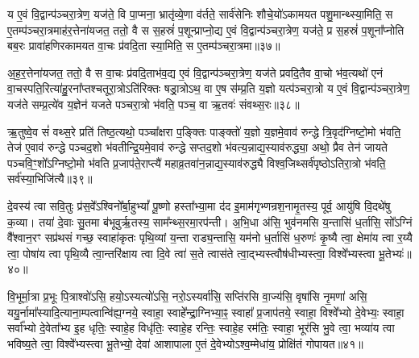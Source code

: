 य ए॒वं वि॒द्वान्प॑ञ्चरा॒त्रेण॒ यज॑ते॒ वि पा॒प्मना॒ भ्रातृ॑व्ये॒णा व॑र्तते॒ सार्व॑सेनिः शौचे॒यो॑\-ऽकामयत पशु॒मान्थ्स्या॒मिति॒ स ए॒तम्प॑ञ्चरा॒त्रमाह॑र॒त्तेना॑यजत॒ ततो॒ वै स स॒हस्रं॑ प॒शून्प्राप्नो॒द्य ए॒वं वि॒द्वान्प॑ञ्चरा॒त्रेण॒ यज॑ते॒ प्र स॒हस्रं॑ प॒शूना᳚प्नोति बब॒रः प्रावा॑हणिरकामयत वा॒चः प्र॑वदि॒ता स्या॒मिति॒ स ए॒तम्प॑ञ्चरा॒त्रमा॥३७॥

अ॒ह॒र॒त्तेना॑यजत॒ ततो॒ वै स वा॒चः प्र॑वदि॒ताभ॑व॒द्य ए॒वं वि॒द्वान्प॑ञ्चरा॒त्रेण॒ यज॑ते प्रवदि॒तैव वा॒चो भ॑व॒त्यथो॑ एनं वा॒चस्पति॒रित्या॑हु॒रना᳚प्तश्चतूरा॒त्रो\-ऽति॑रिक्तः षड्रा॒त्रो\-ऽथ॒ वा ए॒ष स॑म्प्र॒ति य॒ज्ञो यत्प॑ञ्चरा॒त्रो य ए॒वं वि॒द्वान्प॑ञ्चरा॒त्रेण॒ यज॑ते सम्प्र॒त्ये॑व य॒ज्ञेन॑ यजते पञ्चरा॒त्रो भ॑वति॒ पञ्च॒ वा ऋ॒तवः॑ संवथ्स॒रः॥३८॥

ऋ॒तुष्वे॒व सं॑ वथ्स॒रे प्रति॑ तिष्ठ॒त्यथो॒ पञ्चा᳚क्षरा प॒ङ्क्तिः पाङ्क्तो॑ य॒ज्ञो य॒ज्ञमे॒वाव॑ रुन्द्धे त्रि॒वृद॑ग्निष्टो॒मो भ॑वति॒ तेज॑ ए॒वाव॑ रुन्द्धे पञ्चद॒शो भ॑वतीन्द्रि॒यमे॒वाव॑ रुन्द्धे सप्तद॒शो भ॑वत्य॒न्नाद्य॒स्याव॑रुद्ध्या॒ अथो॒ प्रैव तेन॑ जायते पञ्चवि॒ꣳ॒शो᳚\-ऽग्निष्टो॒मो भ॑वति प्र॒जाप॑ते॒राप्त्यै॑ महाव्र॒तवा॑न॒न्नाद्य॒स्याव॑रुद्ध्यै विश्व॒जिथ्सर्व॑पृष्ठो\-ऽतिरा॒त्रो भ॑वति॒ सर्व॑स्या॒भिजि॑त्यै॥३९॥

{\anuvakamend[{ते व्याव॑र्तन्त प्रवदि॒ता स्या॒मिति॒ स ए॒तम्प़॑ञ्चरा॒त्रमा सं॑ वथ्स॒रो॑\-ऽभिजि॑त्यै॥10॥}]}

दे॒वस्य॑ त्वा सवि॒तुः प्र॑स॒वे᳚\-ऽश्विनो᳚र्बा॒हु\-भ्यां᳚ पू॒ष्णो हस्ता᳚भ्या॒मा द॑द इ॒माम॑गृभ्णन्रश॒नामृ॒तस्य॒ पूर्व॒ आयु॑षि वि॒दथे॑षु क॒व्या। तया॑ दे॒वाः सु॒तमा ब॑भूवुर्\mbox{}ऋ॒तस्य॒ साम᳚न्थ्स॒रमा॒रप॑न्ती। अ॒भि॒धा अ॑सि॒ भुव॑नमसि य॒न्तासि॑ ध॒र्तासि॒ सो᳚\-ऽग्निं वै᳚श्वान॒रꣳ सप्र॑थसं गच्छ॒ स्वाहा॑कृतः पृथि॒व्यां य॒न्ता राड्य॒न्तासि॒ यम॑नो ध॒र्तासि॑ ध॒रुणः॑ कृ॒ष्यै त्वा॒ क्षेमा॑य त्वा र॒य्यै त्वा॒ पोषा॑य त्वा पृथि॒व्यै त्वा॒न्तरि॑क्षाय त्वा दि॒वे त्वा॑ स॒ते त्वास॑ते त्वा॒द्भ्यस्त्वौष॑धीभ्यस्त्वा॒ विश्वे᳚भ्यस्त्वा भू॒तेभ्यः॑॥४०॥

{\anuvakamend[{ध॒रुणः॒ प़ञ्च॑विꣳशतिश्च॥11॥}]}

वि॒भूर्मा॒त्रा प्र॒भूः पि॒त्राश्वो॑\-ऽसि॒ हयो॒\-ऽस्यत्यो॑\-ऽसि॒ नरो॒\-ऽस्यर्वा॑सि॒ सप्ति॑रसि वा॒ज्य॑सि॒ वृषा॑सि नृ॒मणा॑ असि॒ ययु॒र्नामा᳚स्यादि॒त्याना॒म्पत्वान्वि॑ह्य॒ग्नये॒ स्वाहा॒ स्वाहे᳚न्द्रा॒ग्निभ्या॒ꣴ॒ स्वाहा᳚ प्र॒जाप॑तये॒ स्वाहा॒ विश्वे᳚भ्यो दे॒वेभ्यः॒ स्वाहा॒ सर्वा᳚भ्यो दे॒वेता᳚भ्य इ॒ह धृतिः॒ स्वाहे॒ह विधृ॑तिः॒ स्वाहे॒ह रन्तिः॒ स्वाहे॒ह रम॑तिः॒ स्वाहा॒ भूर॑सि भु॒वे त्वा॒ भव्या॑य त्वा भविष्य॒ते त्वा॒ विश्वे᳚भ्यस्त्वा भू॒तेभ्यो॒ देवा॑ आशापाला ए॒तं दे॒वेभ्यो\-ऽश्व॒म्मेधा॑य॒ प्रोक्षि॑तं गोपायत॥४१॥

